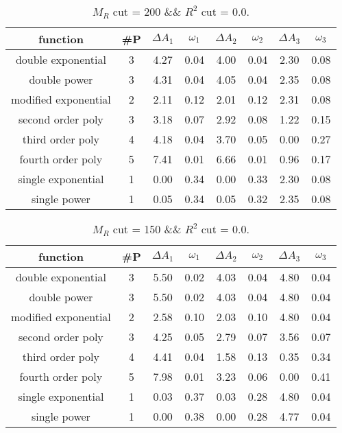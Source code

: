  
\begin{table}[H] 
\begin{center} 
\begin{tabular}{|c|c|cc|cc|cc|} 
\hline function & \#P & $\Delta A_1$ & $\omega_1$ & $\Delta A_2$ & $\omega_2$ & $\Delta A_3$ & $\omega_3$ \\ \hline 
double exponential &  3 &   4.27 &   0.04 &   4.00 &   0.04 &   2.30 &   0.08 \\ 
double power &  3 &   4.31 &   0.04 &   4.05 &   0.04 &   2.35 &   0.08 \\ 
modified exponential &  2 &   2.11 &   0.12 &   2.01 &   0.12 &   2.31 &   0.08 \\ 
second order poly &  3 &   3.18 &   0.07 &   2.92 &   0.08 &   1.22 &   0.15 \\ 
third order poly &  4 &   4.18 &   0.04 &   3.70 &   0.05 &   0.00 &   0.27 \\ 
fourth order poly &  5 &   7.41 &   0.01 &   6.66 &   0.01 &   0.96 &   0.17 \\ 
single exponential &  1 &   0.00 &   0.34 &   0.00 &   0.33 &   2.30 &   0.08 \\ 
single power &  1 &   0.05 &   0.34 &   0.05 &   0.32 &   2.35 &   0.08 \\ 
\hline 
\end{tabular} 
\caption{$M_R$ cut = 200 \&\& $R^2$ cut = 0.0.} 
\label{tab:FitChoices_200_0.0} 
\end{center} 
\end{table} 
 
 
\begin{table}[H] 
\begin{center} 
\begin{tabular}{|c|c|cc|cc|cc|} 
\hline function & \#P & $\Delta A_1$ & $\omega_1$ & $\Delta A_2$ & $\omega_2$ & $\Delta A_3$ & $\omega_3$ \\ \hline 
double exponential &  3 &   5.50 &   0.02 &   4.03 &   0.04 &   4.80 &   0.04 \\ 
double power &  3 &   5.50 &   0.02 &   4.03 &   0.04 &   4.80 &   0.04 \\ 
modified exponential &  2 &   2.58 &   0.10 &   2.03 &   0.10 &   4.80 &   0.04 \\ 
second order poly &  3 &   4.25 &   0.05 &   2.79 &   0.07 &   3.56 &   0.07 \\ 
third order poly &  4 &   4.41 &   0.04 &   1.58 &   0.13 &   0.35 &   0.34 \\ 
fourth order poly &  5 &   7.98 &   0.01 &   3.23 &   0.06 &   0.00 &   0.41 \\ 
single exponential &  1 &   0.03 &   0.37 &   0.03 &   0.28 &   4.80 &   0.04 \\ 
single power &  1 &   0.00 &   0.38 &   0.00 &   0.28 &   4.77 &   0.04 \\ 
\hline 
\end{tabular} 
\caption{$M_R$ cut = 150 \&\& $R^2$ cut = 0.0.} 
\label{tab:FitChoices_150_0.0} 
\end{center} 
\end{table} 
 
 
